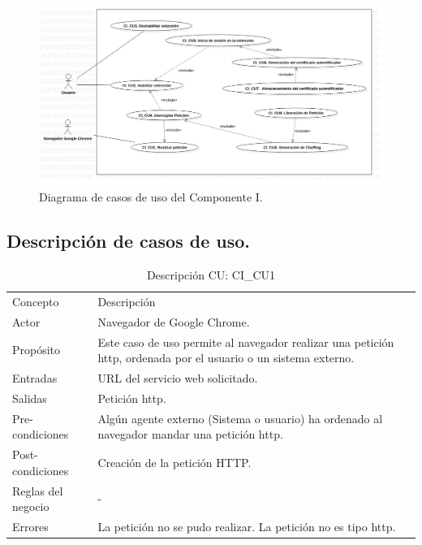 \documentclass[12pt, a4paper, titlepage]{report}
\begin{document}
			    \begin{figure}[H]
		            \begin{center}			                \includegraphics[width=16cm]{./imagenes/Disenio/Componente_1/CI_UCD_P1.png}
						\caption{Diagrama de casos de uso del Componente I.}
                    \end{center}    					
				\end{figure}
			    
	        \subsection{Descripción de casos de uso.}
			    
			    \begin{table}[H]
				\begin{tabular}{ |p{3.5cm}||p{9.5cm}|}
					\hline
					\rowcolor{guindapoli}
					\multicolumn{2}{|c|}{\textbf{\textcolor{white}{Caso de uso: CI\_CU1. Realizar petición.}}}\\
					\hline
					\rowcolor{azulfuerte}Concepto & Descripción\\
					\hline
					\cellcolor{azulclaro}Actor & 
					Navegador de Google Chrome.\\ 
					\hline
					\cellcolor{azulclaro}Propósito &
					Este caso de uso permite al navegador realizar una petición \acrshort{http}, ordenada por el usuario o un sistema externo.\\
					\hline
					\cellcolor{azulclaro}Entradas &
					URL del servicio web solicitado.\\
					\hline
					\cellcolor{azulclaro}Salidas &
					Petición \acrshort{http}.\\
					\hline
					\cellcolor{azulclaro}Pre-condiciones&
					Algún agente externo (Sistema o usuario) ha ordenado al navegador mandar una petición \acrshort{http}.\\
					\hline
					\cellcolor{azulclaro}Post-condiciones&
					Creación de la petición HTTP.\\
					\hline
					\cellcolor{azulclaro}Reglas del negocio&
					-\\
					\hline
					\cellcolor{azulclaro}Errores &
					La petición no se pudo realizar. \newline La petición no es tipo \acrshort{http}.\\					
					\hline
				\end{tabular}
				\caption[DCU: CI\_CU1]{Descripción CU: CI\_CU1}
				\end{table}
				
\end{document}
